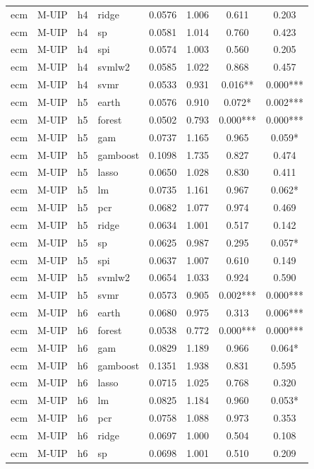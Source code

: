\begin{ThreePartTable}
\begin{longtable}[t]{llclcccc}
ecm & M-UIP & h4 & ridge & 0.0576 & 1.006 & 0.611 & 0.203\\
ecm & M-UIP & h4 & sp & 0.0581 & 1.014 & 0.760 & 0.423\\
ecm & M-UIP & h4 & spi & 0.0574 & 1.003 & 0.560 & 0.205\\
ecm & M-UIP & h4 & svmlw2 & 0.0585 & 1.022 & 0.868 & 0.457\\
ecm & M-UIP & h4 & svmr & 0.0533 & 0.931 & 0.016** & 0.000***\\
\addlinespace
ecm & M-UIP & h5 & earth & 0.0576 & 0.910 & 0.072* & 0.002***\\
ecm & M-UIP & h5 & forest & 0.0502 & 0.793 & 0.000*** & 0.000***\\
ecm & M-UIP & h5 & gam & 0.0737 & 1.165 & 0.965 & 0.059*\\
ecm & M-UIP & h5 & gamboost & 0.1098 & 1.735 & 0.827 & 0.474\\
ecm & M-UIP & h5 & lasso & 0.0650 & 1.028 & 0.830 & 0.411\\
ecm & M-UIP & h5 & lm & 0.0735 & 1.161 & 0.967 & 0.062*\\
ecm & M-UIP & h5 & pcr & 0.0682 & 1.077 & 0.974 & 0.469\\
ecm & M-UIP & h5 & ridge & 0.0634 & 1.001 & 0.517 & 0.142\\
ecm & M-UIP & h5 & sp & 0.0625 & 0.987 & 0.295 & 0.057*\\
ecm & M-UIP & h5 & spi & 0.0637 & 1.007 & 0.610 & 0.149\\
ecm & M-UIP & h5 & svmlw2 & 0.0654 & 1.033 & 0.924 & 0.590\\
ecm & M-UIP & h5 & svmr & 0.0573 & 0.905 & 0.002*** & 0.000***\\
\addlinespace
ecm & M-UIP & h6 & earth & 0.0680 & 0.975 & 0.313 & 0.006***\\
ecm & M-UIP & h6 & forest & 0.0538 & 0.772 & 0.000*** & 0.000***\\
ecm & M-UIP & h6 & gam & 0.0829 & 1.189 & 0.966 & 0.064*\\
ecm & M-UIP & h6 & gamboost & 0.1351 & 1.938 & 0.831 & 0.595\\
ecm & M-UIP & h6 & lasso & 0.0715 & 1.025 & 0.768 & 0.320\\
ecm & M-UIP & h6 & lm & 0.0825 & 1.184 & 0.960 & 0.053*\\
ecm & M-UIP & h6 & pcr & 0.0758 & 1.088 & 0.973 & 0.353\\
ecm & M-UIP & h6 & ridge & 0.0697 & 1.000 & 0.504 & 0.108\\
ecm & M-UIP & h6 & sp & 0.0698 & 1.001 & 0.510 & 0.209\\

\end{longtable}
\end{ThreePartTable}
